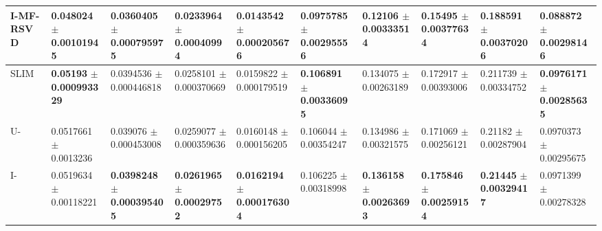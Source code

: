 \begin{table*} [!htb]
{\begin{tabular}{l|llll|llll|l}
		 I-MF-RSVD &  \num{0.048024} $\pm$ \num{0.00101945}&\num{0.0360405} $\pm$ \num{0.000795975}&\num{0.0233964} $\pm$ \num{0.00040994}&\num{0.0143542} $\pm$ \num{0.000205676}&\num{0.0975785} $\pm$ \num{0.00295556}&\num{0.12106} $\pm$ \num{0.00333514}&\num{0.15495} $\pm$ \num{0.00377634}&\num{0.188591} $\pm$ \num{0.00370206}&\num{0.088872} $\pm$ \num{0.00298146}\\
		 \hline
		 SLIM & \textbf{\num{0.05193}} $\pm$ \textbf{\num{0.000993329}} &\num{0.0394536} $\pm$ \num{0.000446818}&\num{0.0258101} $\pm$ \num{0.000370669}&\num{0.0159822} $\pm$ \num{0.000179519}& \textbf{\num{0.106891}} $\pm$ \textbf{\num{0.00336095}} & \num{0.134075} $\pm$ \num{0.00263189}&\num{0.172917} $\pm$ \num{0.00393006}&\num{0.211739} $\pm$ \num{0.00334752}& \textbf{\num{0.0976171}} $\pm$ \textbf{\num{0.00285635}}\\

		U-\LinearLow &  \num{0.0517661} $\pm$ \num{0.0013236}&\num{0.039076} $\pm$ \num{0.000453008}&\num{0.0259077} $\pm$ \num{0.000359636}&\num{0.0160148} $\pm$ \num{0.000156205}&\num{0.106044} $\pm$ \num{0.00354247}&\num{0.134986} $\pm$ \num{0.00321575}&\num{0.171069} $\pm$ \num{0.00256121}&\num{0.21182} $\pm$ \num{0.00287904}&\num{0.0970373} $\pm$ \num{0.00295675}\\

		I-\LinearLow &  \num{0.0519634} $\pm$ \num{0.00118221}& \textbf{\num{0.0398248}} $\pm$ \textbf{\num{0.000395405}}&\textbf{\num{0.0261965}} $\pm$ \textbf{\num{0.00029752}}&\textbf{\num{0.0162194}} $\pm$ \textbf{\num{0.000176304}} &\num{0.106225} $\pm$ \num{0.00318998}&\textbf{\num{0.136158}} $\pm$ \textbf{\num{0.00263693}}& \textbf{\num{0.175846}} $\pm$ \textbf{\num{0.00259154}}&\textbf{\num{0.21445}} $\pm$ \textbf{\num{0.00329417}}&\num{0.0971399} $\pm$ \num{0.00278328} \\


		\hline
	\end{tabular}
}

\end{table*}

